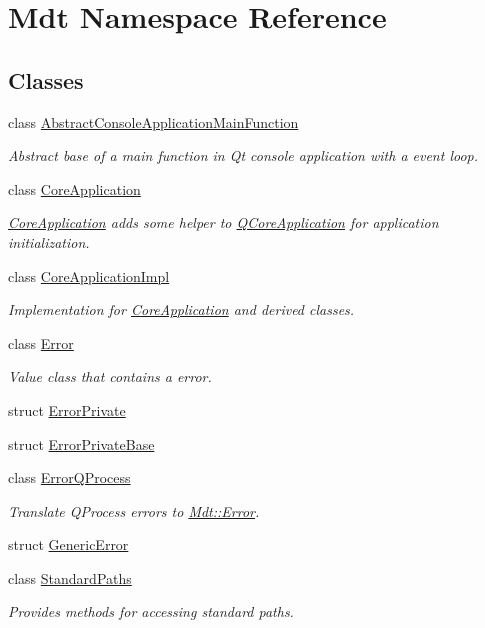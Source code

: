 \hypertarget{namespace_mdt}{}\section{Mdt Namespace Reference}
\label{namespace_mdt}
\subsection*{Classes}
\begin{DoxyCompactItemize}
\item 
class \hyperlink{class_mdt_1_1_abstract_console_application_main_function}{Abstract\+Console\+Application\+Main\+Function}
\begin{DoxyCompactList}\small\item\em Abstract base of a main function in Qt console application with a event loop. \end{DoxyCompactList}\item 
class \hyperlink{class_mdt_1_1_core_application}{Core\+Application}
\begin{DoxyCompactList}\small\item\em \hyperlink{class_mdt_1_1_core_application}{Core\+Application} adds some helper to \hyperlink{class_q_core_application}{Q\+Core\+Application} for application initialization. \end{DoxyCompactList}\item 
class \hyperlink{class_mdt_1_1_core_application_impl}{Core\+Application\+Impl}
\begin{DoxyCompactList}\small\item\em Implementation for \hyperlink{class_mdt_1_1_core_application}{Core\+Application} and derived classes. \end{DoxyCompactList}\item 
class \hyperlink{class_mdt_1_1_error}{Error}
\begin{DoxyCompactList}\small\item\em Value class that contains a error. \end{DoxyCompactList}\item 
struct \hyperlink{struct_mdt_1_1_error_private}{Error\+Private}
\item 
struct \hyperlink{struct_mdt_1_1_error_private_base}{Error\+Private\+Base}
\item 
class \hyperlink{class_mdt_1_1_error_q_process}{Error\+Q\+Process}
\begin{DoxyCompactList}\small\item\em Translate Q\+Process errors to \hyperlink{class_mdt_1_1_error}{Mdt\+::\+Error}. \end{DoxyCompactList}\item 
struct \hyperlink{struct_mdt_1_1_generic_error}{Generic\+Error}
\item 
class \hyperlink{class_mdt_1_1_standard_paths}{Standard\+Paths}
\begin{DoxyCompactList}\small\item\em Provides methods for accessing standard paths. \end{DoxyCompactList}\end{DoxyCompactItemize}

